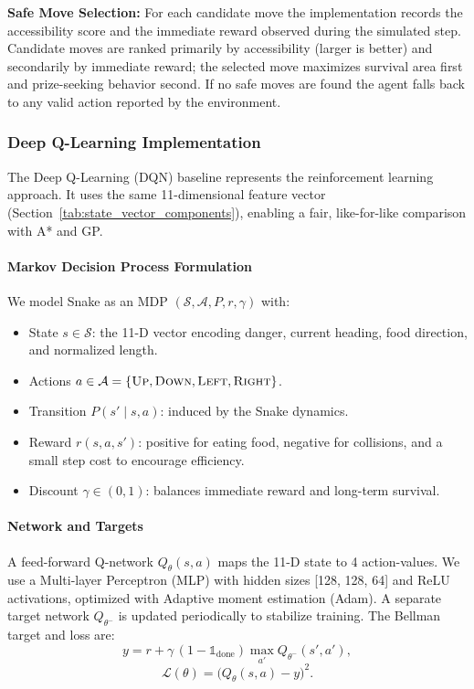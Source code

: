 \documentclass[a4paper,12pt]{article}
\begin{document}
	\textbf{Safe Move Selection:} For each candidate move the implementation records the accessibility score and the immediate reward observed during the simulated step. Candidate moves are ranked primarily by accessibility (larger is better) and secondarily by immediate reward; the selected move maximizes survival area first and prize-seeking behavior second. If no safe moves are found the agent falls back to any valid action reported by the environment.

\subsubsection{Deep Q-Learning Implementation}

The Deep Q-Learning (DQN) baseline represents the reinforcement learning approach. It uses the same 11-dimensional feature vector (Section~\ref{tab:state_vector_components}), enabling a fair, like-for-like comparison with A* and GP.

\paragraph{Markov Decision Process Formulation} We model Snake as an MDP $(\mathcal{S},\mathcal{A},P,r,\gamma)$ with:
\begin{itemize}
   \item State $s\in\mathcal{S}$: the 11-D vector encoding danger, current heading, food direction, and normalized length.
   \item Actions $a\in\mathcal{A}=\{\textsc{Up},\textsc{Down},\textsc{Left},\textsc{Right}\}$.
   \item Transition $P(s'\mid s,a)$: induced by the Snake dynamics.
   \item Reward $r(s,a,s')$: positive for eating food, negative for collisions, and a small step cost to encourage efficiency.
   \item Discount $\gamma\in(0,1)$: balances immediate reward and long-term survival.
\end{itemize}

\paragraph{Network and Targets} A feed-forward Q-network $Q_\theta(s,a)$ maps the 11-D state to 4 action-values. We use a Multi-layer Perceptron (MLP) with hidden sizes [128, 128, 64] and ReLU activations, optimized with Adaptive moment estimation (Adam). A separate target network $Q_{\theta^-}$ is updated periodically to stabilize training. The Bellman target and loss are:
\begin{equation}
   y = r + \gamma\,(1-\mathbb{1}_{\text{done}})\max_{a'} Q_{\theta^-}(s',a'),
\end{equation}
\begin{equation}
   \mathcal{L}(\theta) = \big(Q_\theta(s,a) - y\big)^2.
\end{equation}
\end{document}
